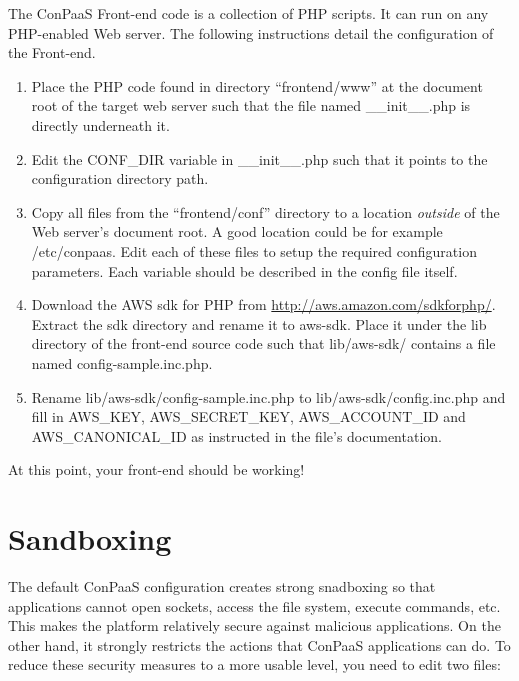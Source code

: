 \documentclass[12pt]{article}
\begin{document}
The ConPaaS Front-end code is a collection of PHP scripts. It can run
on any PHP-enabled Web server. The following instructions detail the
configuration of the Front-end.

\begin{enumerate}
\item Place the PHP code found in directory ``frontend/www'' at the
  document root of the target web server such that the file named
  \_\_init\_\_.php is directly underneath it.

\item Edit the CONF\_DIR variable in \_\_init\_\_.php such that it
  points to the configuration directory path.

\item Copy all files from the ``frontend/conf'' directory to a
  location \emph{outside} of the Web server's document root. A good
  location could be for example /etc/conpaas. Edit each of these files
  to setup the required configuration parameters. Each variable should
  be described in the config file itself.

\item Download the AWS sdk for PHP from
  \href{http://aws.amazon.com/sdkforphp/}{http://aws.amazon.com/sdkforphp/}.
  Extract the sdk directory and rename it to aws-sdk. Place it under
  the lib directory of the front-end source code such that
  lib/aws-sdk/ contains a file named config-sample.inc.php.

\item Rename lib/aws-sdk/config-sample.inc.php to
  lib/aws-sdk/config.inc.php and fill in AWS\_KEY, AWS\_SECRET\_KEY,
  AWS\_ACCOUNT\_ID and AWS\_CANONICAL\_ID as instructed in the file's
  documentation.
\end{enumerate}

At this point, your front-end should be working!

\section{Sandboxing}

The default ConPaaS configuration creates strong snadboxing so that
applications cannot open sockets, access the file system, execute
commands, etc. This makes the platform relatively secure against
malicious applications. On the other hand, it strongly restricts the
actions that ConPaaS applications can do. To reduce these security
measures to a more usable level, you need to edit two files:
\end{document}
